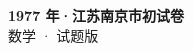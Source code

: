 \documentclass[zihao=-4, a4paper]{ctexart}
\begin{document}
\begin{center}
  {\Large\bfseries 1977 年·江苏南京市初试卷}\\[4pt]
  {\large 数学 · 试题版}
\end{center}
\medskip
{}

\end{document}
